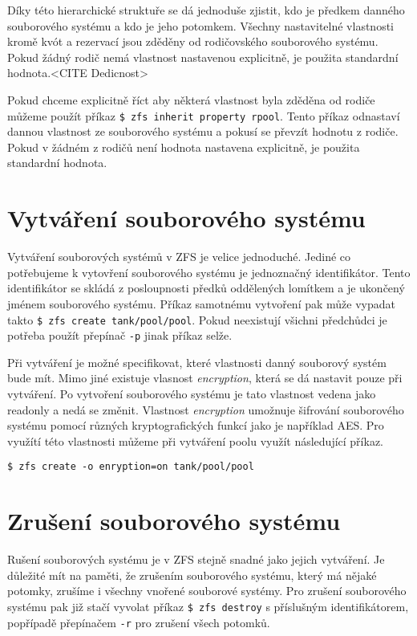 Díky této hierarchické struktuře se dá jednoduše zjistit, kdo je předkem danného souborového systému a kdo je jeho potomkem. Všechny nastavitelné vlastnosti kromě kvót a rezervací jsou zděděny od rodičovského souborového systému. Pokud žádný rodič nemá vlastnost nastavenou explicitně, je použita standardní hodnota.<CITE Dedicnost>

Pokud chceme explicitně říct aby některá vlastnost byla zděděna od rodiče můžeme použít příkaz \verb|$ zfs inherit property rpool|. Tento příkaz odnastaví dannou vlastnost ze souborového systému a pokusí se převzít hodnotu z rodiče. Pokud v žádném z rodičů není hodnota nastavena explicitně, je použita standardní hodnota.
\section{Vytváření souborového systému}
\label{createfs}
Vytváření souborových systémů v ZFS je velice jednoduché. Jediné co potřebujeme k vytovření souborového systému je jednoznačný identifikátor. Tento identifikátor se skládá z posloupnosti předků oddělených lomítkem a je ukončený jménem souborového systému. Příkaz samotnému vytvoření pak může vypadat takto \verb|$ zfs create tank/pool/pool|. Pokud neexistují všichni předchůdci je potřeba použít přepínač \verb|-p| jinak příkaz selže.

Při vytváření je možné specifikovat, které vlastnosti danný souborový systém bude mít. Mimo jiné existuje vlasnost \emph{encryption}, která se dá nastavit pouze při vytváření. Po vytvoření souborového systému je tato vlastnost vedena jako readonly a nedá se změnit. Vlastnost \emph{encryption} umožnuje šifrování souborového systému pomocí různých kryptografických funkcí jako je například AES. Pro využítí této vlastnosti můžeme při vytváření poolu využít následující příkaz.
\begin{verbatim}
$ zfs create -o enryption=on tank/pool/pool
\end{verbatim}
\section{Zrušení souborového systému}
Rušení souborových systému je v ZFS stejně snadné jako jejich vytváření. Je důležité mít na paměti, že zrušením souborového systému, který má nějaké potomky, zrušíme i všechny vnořené souborové systémy. Pro zrušení souborového systému pak již stačí vyvolat příkaz \verb|$ zfs destroy| s příslušným identifikátorem, popřípadě přepínačem \verb|-r| pro zrušení všech potomků.
